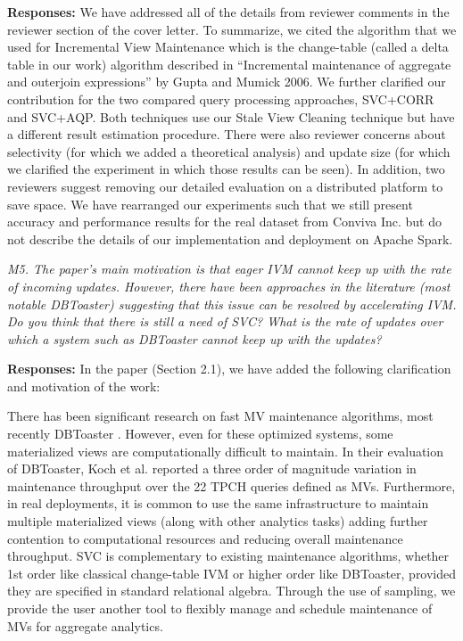 {\bf Responses:} We have addressed all of the details from reviewer comments in the reviewer section of the cover letter. To summarize, we cited the algorithm that we used for Incremental View Maintenance which is the change-table (called a delta table in our work) algorithm described in “Incremental maintenance of aggregate and outerjoin expressions” by Gupta and Mumick 2006. We further clarified our contribution for the two compared query processing approaches, SVC+CORR and SVC+AQP. Both techniques use our Stale View Cleaning technique but have a different result estimation procedure. There were also reviewer concerns about selectivity (for which we added a theoretical analysis) and update size (for which we clarified the experiment in which those results can be seen).
In addition, two reviewers suggest removing our detailed evaluation on a distributed platform to save space. We have rearranged our experiments such that we still present accuracy and performance results for the real dataset from Conviva Inc. but do not describe the details of our implementation and deployment on Apache Spark.

\vspace{1em}
\emph{M5. The paper's main motivation is that eager IVM cannot keep up with the rate of incoming updates. However, there have been approaches in the literature (most notable DBToaster) suggesting that this issue can be resolved by accelerating IVM. Do you think that there is still a need of SVC? What is the rate of updates over which a system such as DBToaster cannot keep up with the updates?}

\vspace{.25em}

{\bf Responses:} In the paper (Section 2.1), we have added the following clarification and motivation of the work:
\begin{displayquote}There has been significant research on fast MV maintenance algorithms, most recently DBToaster \cite{DBLP:journals/vldb/KochAKNNLS14}. However, even for these optimized systems, some materialized views are computationally difficult to maintain. In their evaluation of DBToaster, Koch et al. \cite{DBLP:journals/vldb/KochAKNNLS14} reported a three order of magnitude variation in maintenance throughput over the 22 TPCH queries defined as MVs. Furthermore, in real deployments, it is common to use the same infrastructure to maintain multiple materialized views (along with other analytics tasks) adding further contention to computational resources and reducing overall maintenance throughput. SVC is complementary to existing maintenance algorithms, whether 1st order like classical change-table IVM or higher order like DBToaster, provided they are specified in standard relational algebra. Through the use of sampling, we provide the user another tool to flexibly manage and schedule maintenance of MVs for aggregate analytics.\end{displayquote}

